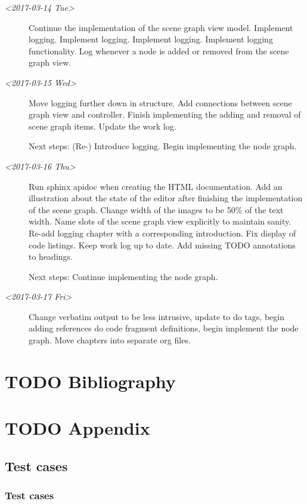 \documentclass[10pt, openright, notitlepage]{scrreprt}
\begin{document}
\begin{description}
\item[{\textit{<2017-03-14 Tue>}}] Continue the implementation of the scene graph view model.
Implement logging. Implement logging. Implement logging. Implement logging
functionality. Log whenever a node is added or removed from the scene graph
view.

\item[{\textit{<2017-03-15 Wed>}}] Move logging further down in structure. Add connections
between scene graph view and controller. Finish implementing the adding and
removal of scene graph items. Update the work log.

Next steps: (Re-) Introduce logging. Begin implementing the node graph.

\item[{\textit{<2017-03-16 Thu>}}] Run sphinx apidoc when creating the HTML documentation.
Add an illustration about the state of the editor after finishing the
implementation of the scene graph. Change width of the images to be 50\% of
the text width. Name slots of the scene graph view explicitly to maintain
sanity. Re-add logging chapter with a corresponding introduction. Fix display
of code listings. Keep work log up to date. Add missing TODO annotations to
headings.

Next steps: Continue implementing the node graph.

\item[{\textit{<2017-03-17 Fri>}}] Change verbatim output to be less intrusive, update to do
tags, begin adding references do code fragment definitions, begin implement
the node graph. Move chapters into separate org files.
\end{description}
\chapter{{\bfseries\sffamily TODO} Bibliography}
\label{sec:org20d33d4}
\printbibliography{}
\chapter{{\bfseries\sffamily TODO} Appendix}
\label{sec:org065d257}
\section{Test cases}
\label{sec:org6048ce6}
\subsection{Test cases}
\label{sec:org6d0449e}
\end{document}
